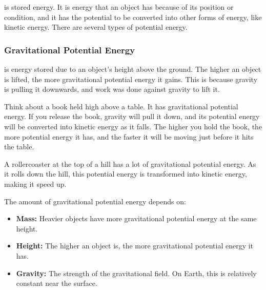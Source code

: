  is stored energy. It is energy that an object has because of its position or condition, and it has the potential to be converted into other forms of energy, like kinetic energy. There are several types of potential energy.

\subsubsection{Gravitational Potential Energy}

 is energy stored due to an object's height above the ground.  The higher an object is lifted, the more gravitational potential energy it gains. This is because gravity is pulling it downwards, and work was done against gravity to lift it.


Think about a book held high above a table. It has gravitational potential energy. If you release the book, gravity will pull it down, and its potential energy will be converted into kinetic energy as it falls. The higher you hold the book, the more potential energy it has, and the faster it will be moving just before it hits the table.

\begin{example}
A rollercoaster at the top of a hill has a lot of gravitational potential energy. As it rolls down the hill, this potential energy is transformed into kinetic energy, making it speed up.
\end{example}

The amount of gravitational potential energy depends on:

\begin{itemize}
    \item \textbf{Mass:} Heavier objects have more gravitational potential energy at the same height.
    \item \textbf{Height:} The higher an object is, the more gravitational potential energy it has.
    \item \textbf{Gravity:} The strength of the gravitational field. On Earth, this is relatively constant near the surface.
\end{itemize}

